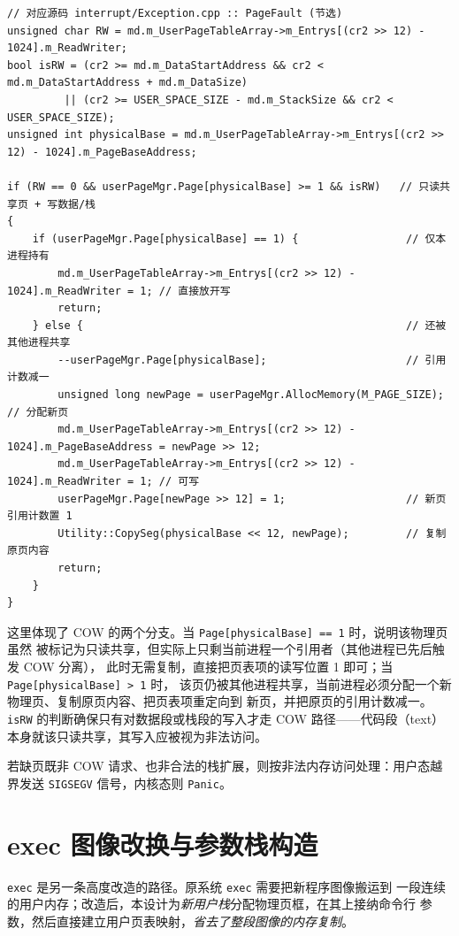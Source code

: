 \begin{lstlisting}[caption={page fault 中的 COW 处理},label={lst:cow-fault}]
// 对应源码 interrupt/Exception.cpp :: PageFault (节选)
unsigned char RW = md.m_UserPageTableArray->m_Entrys[(cr2 >> 12) - 1024].m_ReadWriter;
bool isRW = (cr2 >= md.m_DataStartAddress && cr2 < md.m_DataStartAddress + md.m_DataSize)
         || (cr2 >= USER_SPACE_SIZE - md.m_StackSize && cr2 < USER_SPACE_SIZE);
unsigned int physicalBase = md.m_UserPageTableArray->m_Entrys[(cr2 >> 12) - 1024].m_PageBaseAddress;

if (RW == 0 && userPageMgr.Page[physicalBase] >= 1 && isRW)   // 只读共享页 + 写数据/栈
{
    if (userPageMgr.Page[physicalBase] == 1) {                 // 仅本进程持有
        md.m_UserPageTableArray->m_Entrys[(cr2 >> 12) - 1024].m_ReadWriter = 1; // 直接放开写
        return;
    } else {                                                   // 还被其他进程共享
        --userPageMgr.Page[physicalBase];                      // 引用计数减一
        unsigned long newPage = userPageMgr.AllocMemory(M_PAGE_SIZE); // 分配新页
        md.m_UserPageTableArray->m_Entrys[(cr2 >> 12) - 1024].m_PageBaseAddress = newPage >> 12;
        md.m_UserPageTableArray->m_Entrys[(cr2 >> 12) - 1024].m_ReadWriter = 1; // 可写
        userPageMgr.Page[newPage >> 12] = 1;                   // 新页引用计数置 1
        Utility::CopySeg(physicalBase << 12, newPage);         // 复制原页内容
        return;
    }
}
\end{lstlisting}

这里体现了 COW 的两个分支。当 \texttt{Page[physicalBase] == 1} 时，说明该物理页虽然
被标记为只读共享，但实际上只剩当前进程一个引用者（其他进程已先后触发 COW 分离），
此时无需复制，直接把页表项的读写位置 1 即可；当 \texttt{Page[physicalBase] > 1} 时，
该页仍被其他进程共享，当前进程必须分配一个新物理页、复制原页内容、把页表项重定向到
新页，并把原页的引用计数减一。\texttt{isRW} 的判断确保只有对数据段或栈段的写入才走
COW 路径——代码段（text）本身就该只读共享，其写入应被视为非法访问。

若缺页既非 COW 请求、也非合法的栈扩展，则按非法内存访问处理：用户态越界发送
\texttt{SIGSEGV} 信号，内核态则 \texttt{Panic}。

\section{exec 图像改换与参数栈构造}
\texttt{exec} 是另一条高度改造的路径。原系统 \texttt{exec} 需要把新程序图像搬运到
一段连续的用户内存；改造后，本设计为\emph{新用户栈}分配物理页框，在其上接纳命令行
参数，然后直接建立用户页表映射，\emph{省去了整段图像的内存复制}。

